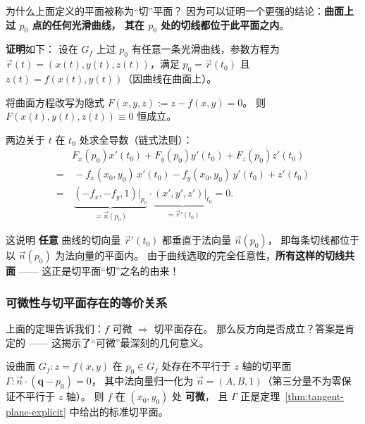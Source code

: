 \documentclass[lang=cn,11pt]{elegantbook}
\begin{document}
\begin{remark} \label{remark:universal-tangent-plane}
为什么上面定义的平面被称为“切”平面？
因为可以证明一个更强的结论：\textbf{曲面上过 $p_0$ 点的任何光滑曲线，
其在 $p_0$ 处的切线都位于此平面之内}。

\textbf{证明}如下：
设在 $G_f$ 上过 $p_0$ 有任意一条光滑曲线，参数方程为
$\vec{r}(t)=(x(t),y(t),z(t))$，满足 $p_0=\vec{r}(t_0)$ 且
$z(t)=f(x(t),y(t))$（因曲线在曲面上）。

将曲面方程改写为隐式 $F(x,y,z):=z-f(x,y)=0$。
则 $F(x(t),y(t),z(t))\equiv 0$ 恒成立。

两边关于 $t$ 在 $t_0$ 处求全导数（链式法则）：
\begin{align*}
&F_x(p_0)x'(t_0)+F_y(p_0)y'(t_0)+F_z(p_0)z'(t_0)\\
=&\,-f_x(x_0,y_0)\,x'(t_0)-f_y(x_0,y_0)\,y'(t_0)+z'(t_0)\\
=&\,\underbrace{(-f_x,-f_y,1)\big|_{p_0}}_{=\vec{n}(p_0)}
   \cdot\underbrace{(x',y',z')\big|_{t_0}}_{=\vec{r}'(t_0)}=0.
\end{align*}

这说明 \textbf{任意} 曲线的切向量 $\vec{r}'(t_0)$ 都垂直于法向量 $\vec{n}(p_0)$，
即每条切线都位于以 $\vec{n}(p_0)$ 为法向量的平面内。
由于曲线选取的完全任意性，\textbf{所有这样的切线共面} ——
这正是切平面“切”之名的由来！
\end{remark}

\subsubsection*{可微性与切平面存在的等价关系}

上面的定理告诉我们：$f$ 可微 $\Longrightarrow$ 切平面存在。
那么反方向是否成立？答案是肯定的 —— 这揭示了“可微”最深刻的几何意义。

\begin{theorem} \label{thm:tangent-diff-equiv}
设曲面 $G_f:z=f(x,y)$ 在 $p_0\in G_f$ 处存在不平行于 $z$ 轴的切平面
$\Gamma:\vec{n}\cdot(\boldsymbol{q}-p_0)=0$，
其中法向量归一化为 $\vec{n}=(A,B,1)$（第三分量不为零保证不平行于 $z$ 轴）。
则 $f$ 在 $(x_0,y_0)$ 处 \textbf{可微}，
且 $\Gamma$ 正是定理~\ref{thm:tangent-plane-explicit} 中给出的标准切平面。
\end{theorem}
\end{document}
